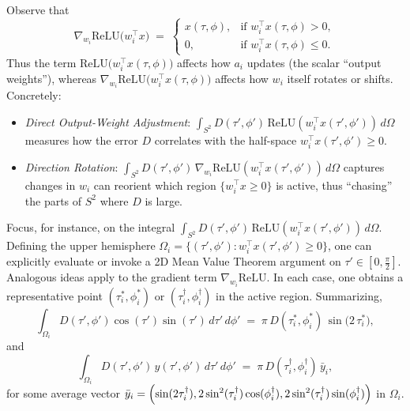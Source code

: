 \documentclass[review,onefignum,onetabnum,onealgnum]{siamart250106}
\numberwithin{theorem}{section}
\begin{document}
Observe that
\[
\nabla_{w_i}\!\mathrm{ReLU}\bigl(w_i^\top x\bigr)
\;=\;
\begin{cases}
x(\tau,\phi), & \text{if } w_i^\top x(\tau,\phi)>0,\\
0, & \text{if } w_i^\top x(\tau,\phi)\le 0.
\end{cases}
\]
Thus the term 
\(\mathrm{ReLU}\bigl(w_i^\top x(\tau,\phi)\bigr)\)
affects how $a_i$ updates (the scalar “output weights”), whereas
\(\nabla_{w_i}\!\mathrm{ReLU}\bigl(w_i^\top x(\tau,\phi)\bigr)\)
affects how $w_i$ itself rotates or shifts.  Concretely:
\begin{itemize}
\item 
\emph{Direct Output-Weight Adjustment}:
\(\int_{S^2}D(\tau',\phi')\,\mathrm{ReLU}(w_i^\top x(\tau',\phi'))\,d\Omega\)
measures how the error $D$ correlates with the half-space $w_i^\top x(\tau',\phi')\ge0$.  
\item 
\emph{Direction Rotation}:
\(\int_{S^2}D(\tau',\phi')\,\nabla_{w_i}\!\mathrm{ReLU}(w_i^\top x(\tau',\phi'))\,d\Omega\) 
captures changes in $w_i$ can reorient which region $\{w_i^\top x\ge0\}$ is active, thus “chasing” the parts of $S^2$ where $D$ is large.
\end{itemize}


Focus, for instance, on the integral
\(\int_{S^2}D(\tau',\phi')\,\mathrm{ReLU}(w_i^\top x(\tau',\phi'))\,d\Omega\).
Defining the upper hemisphere 
\(\Omega_i=\bigl\{(\tau',\phi'): w_i^\top x(\tau',\phi')\ge0\bigr\}\), one can explicitly evaluate or 
invoke a 2D Mean Value Theorem argument on \(\tau'\in[0,\tfrac{\pi}{2}]\).  Analogous ideas apply to the 
gradient term $\nabla_{w_i}\!\mathrm{ReLU}$.  In each case, one obtains a representative point 
\((\tau_i^*,\phi_i^*)\) or \((\tau_i^\dagger,\phi_i^\dagger)\) in the active region.  Summarizing, 
\[
\int_{\Omega_i}
D(\tau',\phi')\cos(\tau')\sin(\tau')\,d\tau'\,d\phi'
\;=\;
\pi\,D(\tau_i^*,\phi_i^*)\,\sin\bigl(2\,\tau_i^*\bigr),
\]
and
\[
\int_{\Omega_i}
D(\tau',\phi')\,y(\tau',\phi')
\,d\tau'\,d\phi'
\;=\;
\pi\,D(\tau_i^\dagger,\phi_i^\dagger)\,\bar{y}_i,
\]
for some average vector $\bar{y}_i = \Bigl(\sin(2\tau_i^\dagger),
2\sin^2(\tau_i^\dagger)\cos(\phi_i^\dagger),
2\sin^2(\tau_i^\dagger)\sin(\phi_i^\dagger)\Bigr)$ in $\Omega_i$.  
\end{document}
